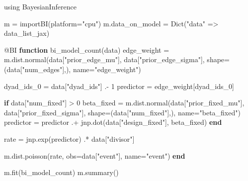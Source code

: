 \documentclass[
  letterpaper,
  DIV=11,
  numbers=noendperiod]{scrartcl}
\newenvironment{Shaded}{\begin{snugshade}}{\end{snugshade}}
\newcommand{\BuiltInTok}[1]{\textcolor[rgb]{0.00,0.23,0.31}{#1}}
\newcommand{\ControlFlowTok}[1]{\textcolor[rgb]{0.00,0.23,0.31}{\textbf{#1}}}
\newcommand{\FloatTok}[1]{\textcolor[rgb]{0.68,0.00,0.00}{#1}}
\newcommand{\FunctionTok}[1]{\textcolor[rgb]{0.28,0.35,0.67}{#1}}
\newcommand{\ImportTok}[1]{\textcolor[rgb]{0.00,0.46,0.62}{#1}}
\newcommand{\KeywordTok}[1]{\textcolor[rgb]{0.00,0.23,0.31}{\textbf{#1}}}
\newcommand{\NormalTok}[1]{\textcolor[rgb]{0.00,0.23,0.31}{#1}}
\newcommand{\OperatorTok}[1]{\textcolor[rgb]{0.37,0.37,0.37}{#1}}
\newcommand{\PreprocessorTok}[1]{\textcolor[rgb]{0.68,0.00,0.00}{#1}}
\newcommand{\StringTok}[1]{\textcolor[rgb]{0.13,0.47,0.30}{#1}}
\begin{document}
\begin{Shaded}
\begin{Highlighting}[]
\ImportTok{using} \BuiltInTok{BayesianInference}

\NormalTok{m }\OperatorTok{=} \FunctionTok{importBI}\NormalTok{(platform}\OperatorTok{=}\StringTok{"cpu"}\NormalTok{)}
\NormalTok{m.data\_on\_model }\OperatorTok{=} \FunctionTok{Dict}\NormalTok{(}\StringTok{"data"} \OperatorTok{=\textgreater{}}\NormalTok{ data\_list\_jax)}

\PreprocessorTok{@BI} \KeywordTok{function} \FunctionTok{bi\_model\_count}\NormalTok{(data)}
\NormalTok{    edge\_weight }\OperatorTok{=}\NormalTok{ m.dist.}\FunctionTok{normal}\NormalTok{(data[}\StringTok{"prior\_edge\_mu"}\NormalTok{], data[}\StringTok{"prior\_edge\_sigma"}\NormalTok{], }
\NormalTok{                                shape}\OperatorTok{=}\NormalTok{(data[}\StringTok{"num\_edges"}\NormalTok{],), name}\OperatorTok{=}\StringTok{"edge\_weight"}\NormalTok{)}
    
\NormalTok{    dyad\_ids\_0 }\OperatorTok{=}\NormalTok{ data[}\StringTok{"dyad\_ids"}\NormalTok{] }\OperatorTok{.{-}} \FloatTok{1}
\NormalTok{    predictor }\OperatorTok{=}\NormalTok{ edge\_weight[dyad\_ids\_0]}
    
    \ControlFlowTok{if}\NormalTok{ data[}\StringTok{"num\_fixed"}\NormalTok{] }\OperatorTok{\textgreater{}} \FloatTok{0}
\NormalTok{        beta\_fixed }\OperatorTok{=}\NormalTok{ m.dist.}\FunctionTok{normal}\NormalTok{(data[}\StringTok{"prior\_fixed\_mu"}\NormalTok{], data[}\StringTok{"prior\_fixed\_sigma"}\NormalTok{], }
\NormalTok{                                   shape}\OperatorTok{=}\NormalTok{(data[}\StringTok{"num\_fixed"}\NormalTok{],), name}\OperatorTok{=}\StringTok{"beta\_fixed"}\NormalTok{)}
\NormalTok{        predictor }\OperatorTok{=}\NormalTok{ predictor }\OperatorTok{.+}\NormalTok{ jnp.}\FunctionTok{dot}\NormalTok{(data[}\StringTok{"design\_fixed"}\NormalTok{], beta\_fixed)}
    \ControlFlowTok{end}
    
\NormalTok{    rate }\OperatorTok{=}\NormalTok{ jnp.}\FunctionTok{exp}\NormalTok{(predictor) }\OperatorTok{.*}\NormalTok{ data[}\StringTok{"divisor"}\NormalTok{]}
    
\NormalTok{    m.dist.}\FunctionTok{poisson}\NormalTok{(rate, obs}\OperatorTok{=}\NormalTok{data[}\StringTok{"event"}\NormalTok{], name}\OperatorTok{=}\StringTok{"event"}\NormalTok{)}
\KeywordTok{end}

\NormalTok{m.}\FunctionTok{fit}\NormalTok{(bi\_model\_count)}
\NormalTok{m.}\FunctionTok{summary}\NormalTok{()}
\end{Highlighting}
\end{Shaded}
\end{document}
